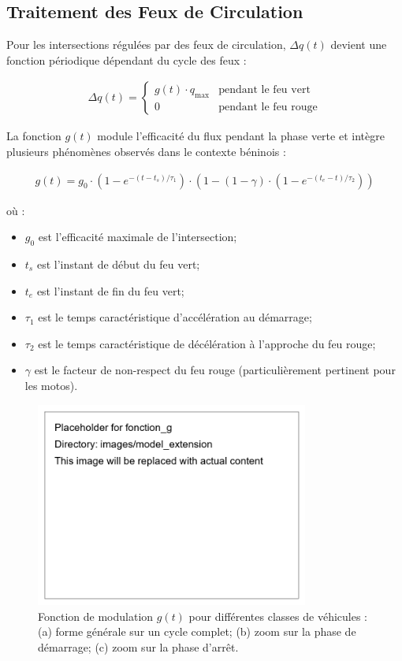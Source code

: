\subsection{Traitement des Feux de Circulation}
\label{subsec:feux_circulation}

Pour les intersections régulées par des feux de circulation, $\Delta q(t)$ devient une fonction périodique dépendant du cycle des feux :

\begin{align}
\Delta q(t) = 
\begin{cases}
g(t) \cdot q_{\max} & \text{pendant le feu vert} \\
0 & \text{pendant le feu rouge}
\end{cases}
\label{eq:delta_q_feux_detaille}
\end{align}

La fonction $g(t)$ module l'efficacité du flux pendant la phase verte et intègre plusieurs phénomènes observés dans le contexte béninois :

\begin{align}
g(t) = g_0 \cdot (1 - e^{-(t-t_s)/\tau_1}) \cdot (1 - (1-\gamma) \cdot (1 - e^{-(t_e-t)/\tau_2}))
\label{eq:fonction_g}
\end{align}

où :
\begin{itemize}
\item $g_0$ est l'efficacité maximale de l'intersection;
\item $t_s$ est l'instant de début du feu vert;
\item $t_e$ est l'instant de fin du feu vert;
\item $\tau_1$ est le temps caractéristique d'accélération au démarrage;
\item $\tau_2$ est le temps caractéristique de décélération à l'approche du feu rouge;
\item $\gamma$ est le facteur de non-respect du feu rouge (particulièrement pertinent pour les motos).
\end{itemize}

\begin{figure}[htbp]
\centering
\includegraphics[width=0.8\textwidth]{images/model_extension/fonction_g}
\caption{Fonction de modulation $g(t)$ pour différentes classes de véhicules : (a) forme générale sur un cycle complet; (b) zoom sur la phase de démarrage; (c) zoom sur la phase d'arrêt.}
\label{fig:fonction_g}
\end{figure}

